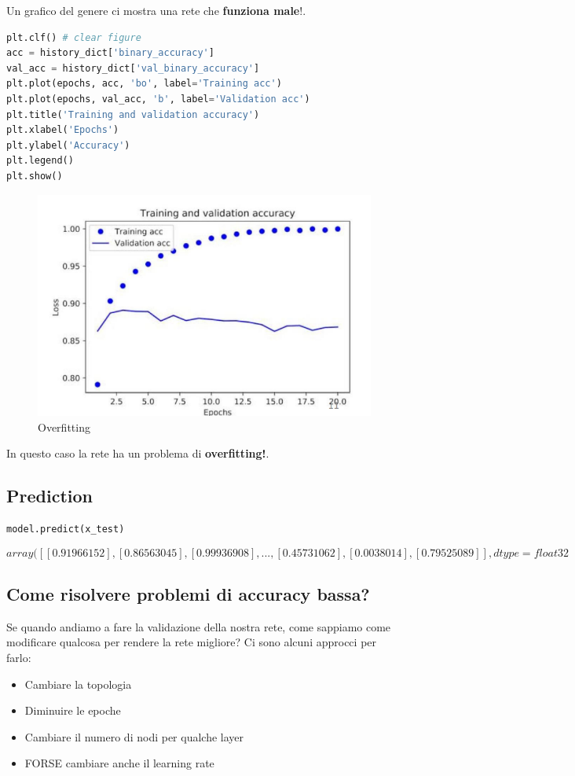 Un grafico del genere ci mostra una rete che \textbf{funziona male}!.

\begin{lstlisting}[language=Python]
plt.clf() # clear figure
acc = history_dict['binary_accuracy']
val_acc = history_dict['val_binary_accuracy']
plt.plot(epochs, acc, 'bo', label='Training acc')
plt.plot(epochs, val_acc, 'b', label='Validation acc')
plt.title('Training and validation accuracy')
plt.xlabel('Epochs')
plt.ylabel('Accuracy')
plt.legend()
plt.show()

\end{lstlisting}

\begin{figure}[H]
    \centering
    \includegraphics[width=0.8\linewidth]{images/overfitting.png}
    \caption{Overfitting}
    \label{fig:overfitting}
\end{figure}

In questo caso la rete ha un problema di \textbf{overfitting!}.

\subsection{Prediction}
\begin{lstlisting}
model.predict(x_test)
\end{lstlisting}
\[array([[ 0.91966152], [ 0.86563045], [ 0.99936908], ..., [ 0.45731062], [
                    0.0038014 ], [ 0.79525089]], dtype=float32\]

\subsection{Come risolvere problemi di accuracy bassa?}
Se quando andiamo a fare la validazione della nostra rete, come sappiamo come
modificare qualcosa per rendere la rete migliore? Ci sono alcuni approcci per
farlo:
\begin{itemize}
    \item Cambiare la topologia
    \item Diminuire le epoche
    \item Cambiare il numero di nodi per qualche layer
    \item FORSE cambiare anche il learning rate
\end{itemize}

